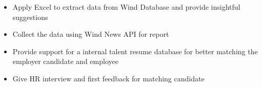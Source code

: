 \documentclass{resume}
\newcommand{\en}[1]{#1}
\newcommand{\zh}[1]{}
\begin{document}
\en{}
\zh{\datedsubsection{\textbf{\href{https://www.cfsc.com.cn/}{华鑫证券有限责任公司}}}{09/2021 -- 11/2021}}
\vspace{2 mm}

\en{}
\zh{\role{实习}{数据处理组}}
\vspace{2 mm}

\begin{itemize}
      \item \en{Apply Excel to extract data from Wind Database and provide insightful suggestions}
            \zh{用Excel从Wind数据库中提取数据，提供数据分析建议}
      \item \en{Collect the data using Wind News API for report}
            \zh{使用Wind新闻API收集数据，用于报告}
\end{itemize}
\vspace{2 mm}

\en{}
\zh{\datedsubsection{\textbf{\href{https://www.liepin.com/}{猎聘网}}}{05/2020 -- 07/2020}}
\vspace{2 mm}

\en{}
\zh{\role{实习}{金融组HR部门}}
\vspace{2 mm}

\begin{itemize}
      \item \en{Provide support for a internal talent resume database for better matching the employer candidate and employee}
            \zh{为内部人才库提供支持，更好地匹配雇主候选人和员工}
      \item \en{Give HR interview and first feedback for matching candidate}
            \zh{为候选人进行HR面试和初步反馈}
\end{itemize}

\vspace{2 mm}
\end{document}

